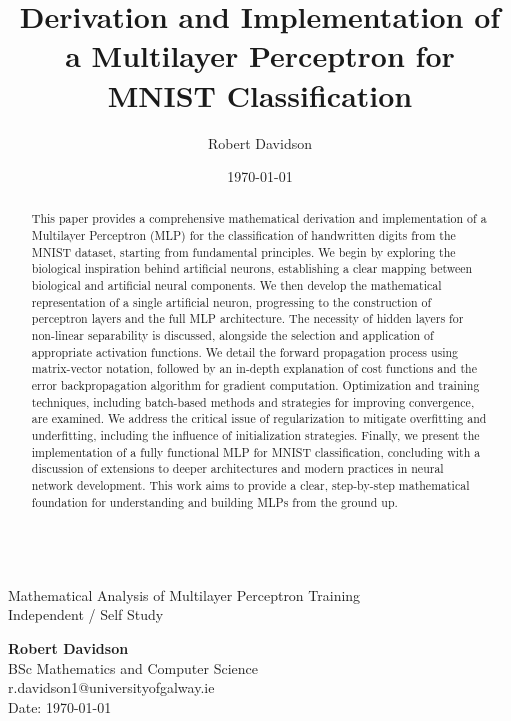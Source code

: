 \documentclass[9pt]{extarticle}
\title{Derivation and Implementation of a Multilayer Perceptron for MNIST Classification}
\author{Robert Davidson}
\date{\today}
\begin{document}
\begin{center}
     \\
    \vspace{0.5cm}
    Mathematical Analysis of Multilayer Perceptron Training\\
    Independent / Self Study\\[24pt]
    \LARGE

    \Large
    \textbf{Robert Davidson}\\[6pt]
    \small
    BSc Mathematics and Computer Science \\ r.davidson1@universityofgalway.ie\\[6pt]
    Date: \today\\[12pt]
\end{center}
\begin{abstract}
    \begin{adjustwidth}{1cm}{1cm}
        This paper provides a comprehensive mathematical derivation and implementation of a Multilayer Perceptron (MLP)
        for the classification of handwritten digits from the MNIST dataset, starting from fundamental principles.
        We begin by exploring the biological inspiration behind artificial neurons, establishing a clear mapping between biological and artificial neural components.
        We then develop the mathematical representation of a single artificial neuron, progressing to the construction of perceptron layers and the full MLP architecture.
        The necessity of hidden layers for non-linear separability is discussed, alongside the selection and application of appropriate activation functions.
        We detail the forward propagation process using matrix-vector notation, followed by an in-depth explanation of cost functions and the error backpropagation algorithm
        for gradient computation. Optimization and training techniques, including batch-based methods and strategies for improving convergence, are examined.
        We address the critical issue of regularization to mitigate overfitting and underfitting, including the influence of initialization strategies.
        Finally, we present the implementation of a fully functional MLP for MNIST classification, concluding with a discussion of extensions to deeper architectures
        and modern practices in neural network development. This work aims to provide a clear, step-by-step mathematical foundation for understanding and building MLPs from the ground up.
    \end{adjustwidth}
\end{abstract}
\end{document}

